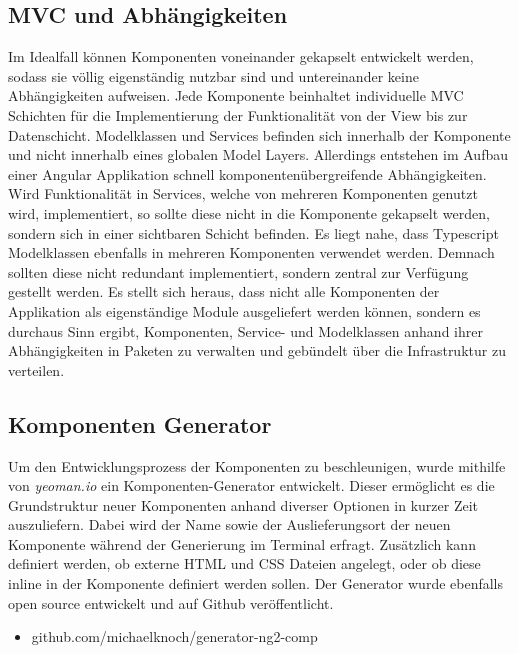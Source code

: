 \subsection{MVC und Abhängigkeiten}

Im Idealfall können Komponenten voneinander gekapselt entwickelt werden,
sodass sie völlig eigenständig nutzbar sind und untereinander keine Abhängigkeiten aufweisen.
Jede Komponente beinhaltet individuelle \ac{MVC} Schichten für die Implementierung der Funktionalität von der View bis zur Datenschicht.
Modelklassen und Services befinden sich innerhalb der Komponente und nicht innerhalb eines globalen Model Layers.
Allerdings entstehen im Aufbau einer Angular Applikation schnell komponentenübergreifende Abhängigkeiten.
Wird Funktionalität in Services, welche von mehreren Komponenten genutzt wird, implementiert,
so sollte diese nicht in die Komponente gekapselt werden, sondern sich in einer sichtbaren Schicht befinden.
Es liegt nahe, dass Typescript Modelklassen ebenfalls in mehreren Komponenten verwendet werden.
Demnach sollten diese nicht redundant implementiert,
sondern zentral zur Verfügung gestellt werden. Es stellt sich heraus,
dass nicht alle Komponenten der Applikation \projectname{} als eigenständige Module ausgeliefert werden können,
sondern es durchaus Sinn ergibt, Komponenten, Service- und Modelklassen anhand ihrer Abhängigkeiten in Paketen zu verwalten und
gebündelt über die Infrastruktur zu verteilen.


\subsection{Komponenten Generator}

Um den Entwicklungsprozess der Komponenten zu beschleunigen, wurde mithilfe von \emph{yeoman.io} ein Komponenten-Generator entwickelt.
Dieser ermöglicht es die Grundstruktur neuer Komponenten anhand diverser Optionen in kurzer Zeit auszuliefern.
Dabei wird der Name sowie der Auslieferungsort der neuen Komponente während der Generierung im Terminal erfragt.
Zusätzlich kann definiert werden, ob externe \ac{HTML} und \ac{CSS} Dateien angelegt, oder ob diese inline in der Komponente definiert werden sollen.
Der Generator wurde ebenfalls open source entwickelt und auf Github veröffentlicht.

\begin{itemize}
\item github.com/michaelknoch/generator-ng2-comp
\end{itemize}


